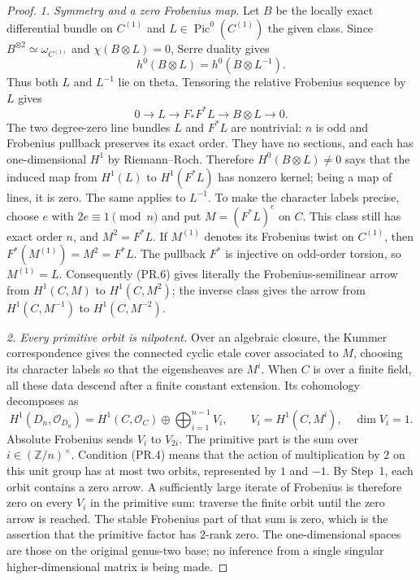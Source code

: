 \documentclass[11pt,a4paper]{article}
\begin{document}
\begin{proof}
\emph{1. Symmetry and a zero Frobenius map.}
Let $B$ be the locally exact differential bundle on $C^{(1)}$ and
$L\in\operatorname{Pic}^0(C^{(1)})$ the given class. Since
$B^{\otimes2}\simeq\omega_{C^{(1)}}$ and $\chi(B\otimes L)=0$,
Serre duality gives
\[
 h^0(B\otimes L)=h^0(B\otimes L^{-1}).
 \tag{PR.5}
\]
Thus both $L$ and $L^{-1}$ lie on theta. Tensoring the relative
Frobenius sequence by $L$ gives
\[
 0\longrightarrow L\longrightarrow F_*F^*L
       \longrightarrow B\otimes L\longrightarrow0.
 \tag{PR.6}
\]
The two degree-zero line bundles $L$ and $F^*L$ are nontrivial:
$n$ is odd and Frobenius pullback preserves its exact order.
They have no sections, and each has one-dimensional $H^1$ by
Riemann--Roch. Therefore $H^0(B\otimes L)\ne0$ says that the
induced map from $H^1(L)$ to $H^1(F^*L)$ has nonzero kernel;
being a map of lines, it is zero. The same applies to $L^{-1}$.
To make the character labels precise, choose $e$ with $2e\equiv1
\pmod n$ and put $M=(F^*L)^e$ on $C$. This class still has exact
order $n$, and $M^2=F^*L$. If $M^{(1)}$ denotes its Frobenius
twist on $C^{(1)}$, then $F^*(M^{(1)})=M^2=F^*L$.
The pullback $F^*$ is injective on odd-order torsion, so
$M^{(1)}=L$. Consequently (PR.6) gives literally the
Frobenius-semilinear arrow from $H^1(C,M)$ to $H^1(C,M^2)$;
the inverse class gives the arrow from $H^1(C,M^{-1})$ to
$H^1(C,M^{-2})$.

\emph{2. Every primitive orbit is nilpotent.}
Over an algebraic closure, the Kummer correspondence gives the
connected cyclic etale cover associated to $M$, choosing its
character labels so that the eigensheaves are $M^i$.
When $C$ is over a finite field, all these data descend after a
finite constant extension. Its cohomology decomposes as
\[
 H^1(D_n,\mathcal O_{D_n})=
   H^1(C,\mathcal O_C)\oplus
   \bigoplus_{i=1}^{n-1} V_i,\qquad
   V_i=H^1(C,M^i),\quad \dim V_i=1.
 \tag{PR.7}
\]
Absolute Frobenius sends $V_i$ to $V_{2i}$. The primitive part is
the sum over $i\in(\mathbb Z/n)^\times$.
Condition (PR.4) means that the action of multiplication by $2$
on this unit group has at most two orbits, represented by $1$ and
$-1$. By Step~1, each orbit contains a zero arrow. A sufficiently
large iterate of Frobenius is therefore zero on every $V_i$ in
the primitive sum: traverse the finite orbit until the zero arrow
is reached. The stable Frobenius part of that sum is zero, which
is the assertion that the primitive factor has $2$-rank zero.
The one-dimensional spaces are those on the original genus-two
base; no inference from a single singular higher-dimensional
matrix is being made.


\end{proof}
\end{document}
